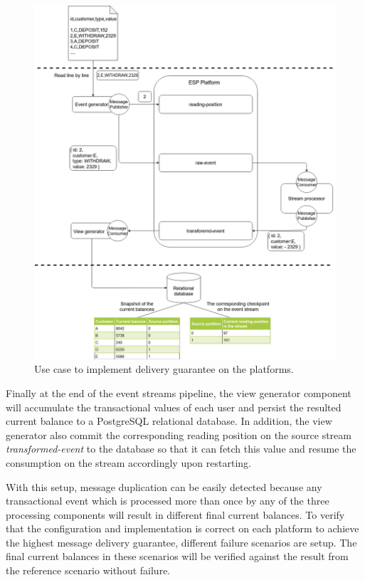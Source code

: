 \begin{figure}
\begin{adjustwidth}{-1cm}{}
	\centering
	\includegraphics[width=18cm,height=\textheight]{images/implementation-use-case-1.png}
	
\end{adjustwidth}
\caption{Use case to implement delivery guarantee on the platforms.}
\label{fig:impusecase}
\end{figure}


Finally at the end of the event streams pipeline, the view generator component will accumulate the transactional values of each user and persist the resulted current balance to a PostgreSQL relational database. In addition, the view generator also commit the corresponding reading position on the source stream \emph{transformed-event} to the database so that it can fetch this value and resume the consumption on the stream accordingly upon restarting.


With this setup, message duplication can be easily detected because any transactional event which is processed more than once by any of the three processing components will result in different final current balances. To verify that the configuration and implementation is correct on each platform to achieve the highest message delivery guarantee, different failure scenarios are setup. The final current balances in these scenarios will be verified against the result from the reference scenario without failure.


